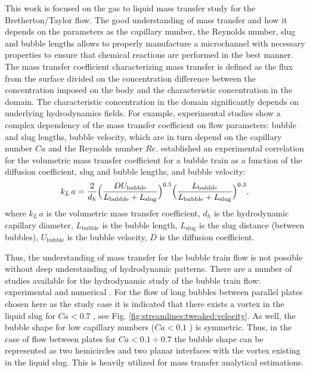 \documentclass{article}
\newcommand{\vol}{k_L\,a}
\newcommand{\lbubble}{L_{\mathrm{bubble}}}
\newcommand{\lslug}{L_{\mathrm{slug}}}
\newcommand{\ububble}{U_{\mathrm{bubble}}}
\begin{document}
This work is focused on the gas to liquid mass transfer 
study for the Bretherton/Taylor flow. The good understanding of mass transfer and how it depends on the
parameters as the capillary number, the Reynolds number, slug and bubble lengths allows to properly
manufacture a microchannel with necessary properties to ensure that chemical
reactions are performed in the best manner. The mass transfer coefficient characterizing mass transfer is defined as the flux from the surface divided on the concentration difference between the concentration imposed on the body and the characteristic concentration in the domain. The characteristic concentration in the domain significantly depends on underlying hydrodynamics fields.  For example, experimental studies \cite{yue-mass,bercic-mass} show a complex dependency of the mass transfer coefficient on flow parameters: bubble and slug lengths, bubble velocity, which are in turn depend on the capillary number $Ca$ and the Reynolds number $Re$. 
\citet{yue-mass} established an experimental correlation for the volumetric mass transfer coefficient for a bubble train as
a function of the diffusion coefficient, slug and bubble lengths, and bubble velocity: 
\begin{equation}
\vol =\frac{2}{d_h} \Bigl(\frac{D
\ububble}{\lbubble+\lslug}\Bigr)^{0.5}
\Bigl(\frac{\lbubble}{\lbubble+\lslug}\Bigr)^{0.3},
\end{equation}
where $\vol$ is the volumetric mass transfer coefficient, $d_h$ is the hydrodynamic capillary
diameter, $\lbubble$ is the bubble length, $\lslug$ is the slug distance (between bubbles),
$\ububble$ is the bubble velocity, $D$ is the diffusion coefficient. 

Thus, the understanding of mass transfer for the bubble train flow is not possible without deep understanding of hydrodynamic patterns. There are a number of studies available for the hydrodynamic study of the bubble train flow: experimental \cite{kreutzer-pressure-drop,cerro-space,cerro-bubble-train} and numerical \cite{wang-non-circular,kuzmin-binary3d,giavedoni-numerical,heil-threedim}. For the flow of long bubbles between parallel plates chosen here as the study case it is indicated that  there exists a vortex in the liquid slug for $Ca<0.7$ , see Fig. \ref{fig:streamlines:tweaked:velocity}.  As well, the bubble shape for low capillary numbers ($Ca<0.1$ \cite{cerro-bubble-train}) is symmetric. Thus, in the case of flow between plates for $Ca<0.1\div0.7$ the bubble shape can be represented as two hemicircles and two planar interfaces with the vortex existing in the liquid slug. This is heavily utilized for mass transfer analytical estimations.
\end{document}
